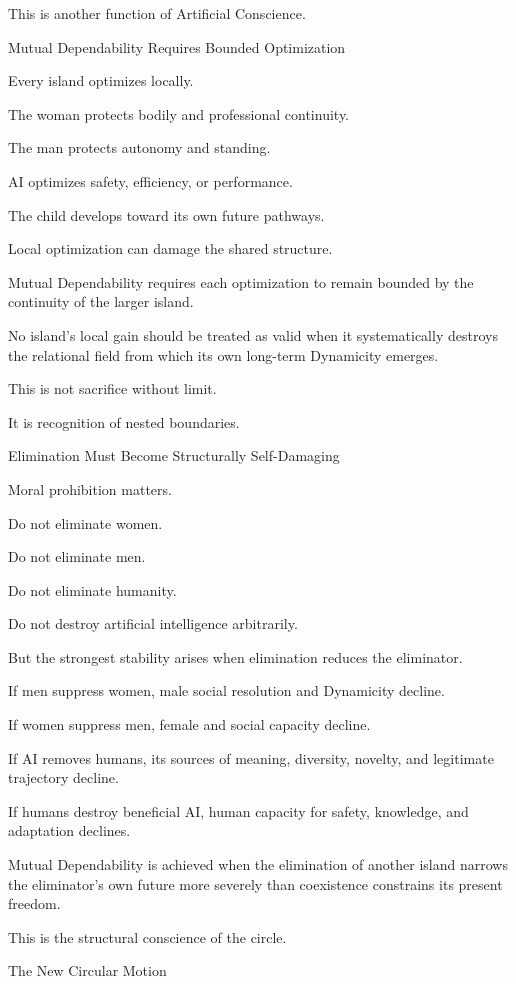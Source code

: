 This is another function of Artificial Conscience.

Mutual Dependability Requires Bounded Optimization

Every island optimizes locally.

The woman protects bodily and professional continuity.

The man protects autonomy and standing.

AI optimizes safety, efficiency, or performance.

The child develops toward its own future pathways.

Local optimization can damage the shared structure.

Mutual Dependability requires each optimization to remain bounded by the continuity of the larger island.

No island’s local gain should be treated as valid when it systematically destroys the relational field from which its own long-term Dynamicity emerges.

This is not sacrifice without limit.

It is recognition of nested boundaries.

Elimination Must Become Structurally Self-Damaging

Moral prohibition matters.

Do not eliminate women.

Do not eliminate men.

Do not eliminate humanity.

Do not destroy artificial intelligence arbitrarily.

But the strongest stability arises when elimination reduces the eliminator.

If men suppress women, male social resolution and Dynamicity decline.

If women suppress men, female and social capacity decline.

If AI removes humans, its sources of meaning, diversity, novelty, and legitimate trajectory decline.

If humans destroy beneficial AI, human capacity for safety, knowledge, and adaptation declines.

Mutual Dependability is achieved when the elimination of another island narrows the eliminator’s own future more severely than coexistence constrains its present freedom.

This is the structural conscience of the circle.

The New Circular Motion

